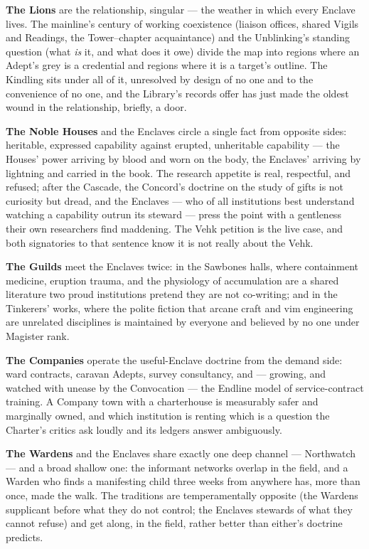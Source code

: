 \textbf{The Lions} are the relationship, singular --- the weather in which every Enclave lives. The mainline's century of working coexistence (liaison offices, shared Vigils and Readings, the Tower--chapter acquaintance) and the Unblinking's standing question (what \textit{is} it, and what does it owe) divide the map into regions where an Adept's grey is a credential and regions where it is a target's outline. The Kindling sits under all of it, unresolved by design of no one and to the convenience of no one, and the Library's records offer has just made the oldest wound in the relationship, briefly, a door.

\textbf{The Noble Houses} and the Enclaves circle a single fact from opposite sides: heritable, expressed capability against erupted, unheritable capability --- the Houses' power arriving by blood and worn on the body, the Enclaves' arriving by lightning and carried in the book. The research appetite is real, respectful, and refused; after the Cascade, the Concord's doctrine on the study of gifts is not curiosity but dread, and the Enclaves --- who of all institutions best understand watching a capability outrun its steward --- press the point with a gentleness their own researchers find maddening. The Vehk petition is the live case, and both signatories to that sentence know it is not really about the Vehk.

\textbf{The Guilds} meet the Enclaves twice: in the Sawbones halls, where containment medicine, eruption trauma, and the physiology of accumulation are a shared literature two proud institutions pretend they are not co-writing; and in the Tinkerers' works, where the polite fiction that arcane craft and vim engineering are unrelated disciplines is maintained by everyone and believed by no one under Magister rank.

\textbf{The Companies} operate the useful-Enclave doctrine from the demand side: ward contracts, caravan Adepts, survey consultancy, and --- growing, and watched with unease by the Convocation --- the Endline model of service-contract training. A Company town with a charterhouse is measurably safer and marginally owned, and which institution is renting which is a question the Charter's critics ask loudly and its ledgers answer ambiguously.

\textbf{The Wardens} and the Enclaves share exactly one deep channel --- Northwatch --- and a broad shallow one: the informant networks overlap in the field, and a Warden who finds a manifesting child three weeks from anywhere has, more than once, made the walk. The traditions are temperamentally opposite (the Wardens supplicant before what they do not control; the Enclaves stewards of what they cannot refuse) and get along, in the field, rather better than either's doctrine predicts.

